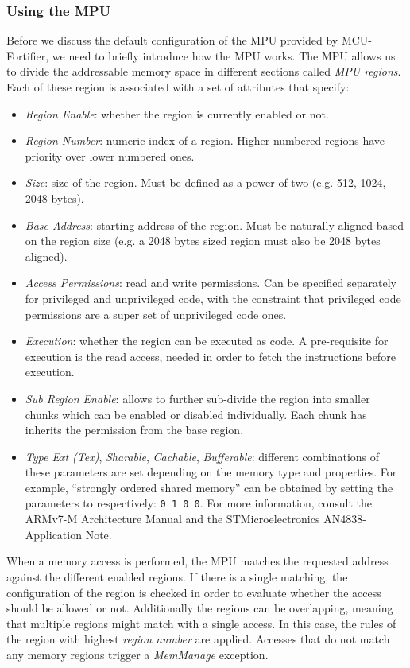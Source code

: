 \documentclass{article}
\begin{document}
\subsubsection{Using the MPU}
\label{subsubsec:using_mpu}
Before we discuss the default configuration of the MPU provided by MCU-Fortifier, we need to briefly introduce how the MPU works. The MPU allows us to divide the addressable memory space in different sections called \textit{MPU regions}. Each of these region is associated with a set of attributes that specify:
\begin{itemize}
	\item \textit{Region Enable}: whether the region is currently enabled or not.
	\item \textit{Region Number}: numeric index of a region. Higher numbered regions have priority over lower numbered ones.
	\item \textit{Size}: size of the region. Must be defined as a power of two (e.g. 512, 1024, 2048 bytes).
	\item \textit{Base Address}: starting address of the region. Must be naturally aligned based on the region size (e.g. a 2048 bytes sized region must also be 2048 bytes aligned).
	\item \textit{Access Permissions}: read and write permissions. Can be specified separately for privileged and unprivileged code, with the constraint that privileged code permissions are a super set of unprivileged code ones.
	\item \textit{Execution}: whether the region can be executed as code. A pre-requisite for execution is the read access, needed in order to fetch the instructions before execution.
	\item \textit{Sub Region Enable}: allows to further sub-divide the region into smaller chunks which can be enabled or disabled individually. Each chunk has inherits the permission from the base region.
	\item \textit{Type Ext (Tex)}, \textit{Sharable}, \textit{Cachable}, \textit{Bufferable}: different combinations of these parameters are set depending on the memory type and properties. For example, ``strongly ordered shared memory'' can be obtained by setting the parameters to respectively: \verb|0 1 0 0|. For more information, consult the ARMv7-M Architecture Manual\cite{armv7m} and the STMicroelectronics AN4838-Application Note\cite{an4838}.
\end{itemize}

When a memory access is performed, the MPU matches the requested address against the different enabled regions. If there is a single matching, the configuration of the region is checked in order to evaluate whether the access should be allowed or not. Additionally the regions can be overlapping, meaning that multiple regions might match with a single access. In this case, the rules of the region with highest \textit{region number} are applied.
Accesses that do not match any memory regions trigger a \textit{MemManage} exception.
\end{document}
